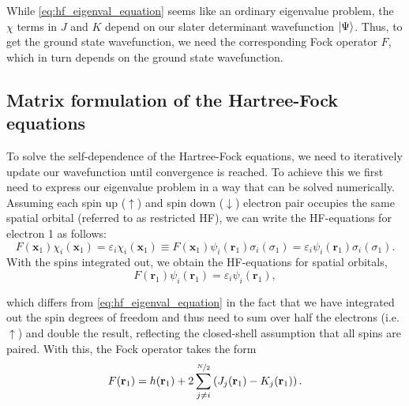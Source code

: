 While \autoref{eq:hf_eigenval_equation} seems like an ordinary eigenvalue problem, the $\chi$ terms in $J$ and $K$ depend on our slater determinant wavefunction $\ket{\Psi}$. Thus, to get the ground state wavefunction, we need the corresponding Fock operator $F$, which in turn depends on the ground state wavefunction. 


\subsection{Matrix formulation of the Hartree-Fock equations}
\label{subsec:background_hf_computational}
To solve the self-dependence of the Hartree-Fock equations, we need to iteratively update our wavefunction until convergence is reached. To achieve this we first need to express our eigenvalue problem in a way that can be solved numerically. Assuming each spin up ($\uparrow$) and spin down ($\downarrow$) electron pair occupies the same spatial orbital (referred to as restricted HF), we can write the HF-equations for electron 1 as follows:
\begin{equation}
    F(\mathbf{x}_1) \chi_i(\mathbf{x}_1) = \varepsilon_i \chi_i(\mathbf{x}_1) \equiv F(\mathbf{x}_1) \psi_i(\mathbf{r}_1) \sigma_i(\sigma_1) = \varepsilon_i \psi_i(\mathbf{r}_1) \sigma_i(\sigma_1).
\end{equation}
With the spins integrated out, we obtain the HF-equations for spatial orbitals, 
\begin{equation}
    \label{eq:hf_eigenval_equation_spatial}
    F(\mathbf{r}_1) \psi_i(\mathbf{r}_1) = \varepsilon_i \psi_i(\mathbf{r}_1),
\end{equation}

which differs from \autoref{eq:hf_eigenval_equation} in the fact that we have integrated out the spin degrees of freedom and thus need to sum over half the electrons (i.e. $\uparrow$) and double the result, reflecting the closed-shell assumption that all spins are paired. With this, the Fock operator takes the form 
\begin{equation}
    \label{eq:fock_operator_spatial}
    F(\mathbf{r}_1) = h(\mathbf{r}_1) + 2 \sum_{j\neq i}^{\nicefrac{N}{2}} \left( J_j(\mathbf{r}_1) - K_j(\mathbf{r}_1) \right).
\end{equation}

